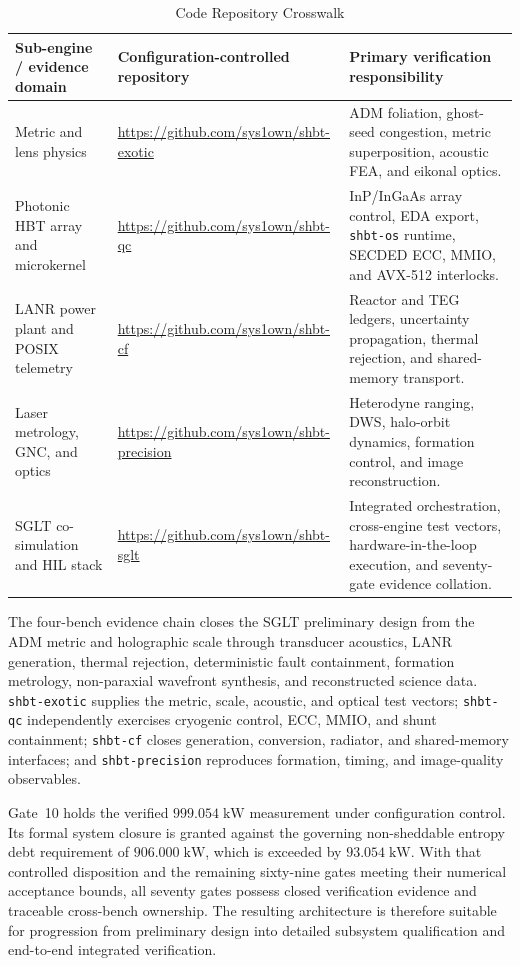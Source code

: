 \documentclass[10pt,twocolumn]{IEEEtran}
\newcommand{\shbtos}{\texttt{shbt-os}}
\begin{document}
\begin{table}[t]
\caption{Code Repository Crosswalk}
\label{tab:repository_crosswalk}
\centering
\footnotesize
\begin{tabular}{@{}p{4.1cm}p{6.3cm}p{5.4cm}@{}}
\toprule
Sub-engine / evidence domain & Configuration-controlled repository & Primary verification responsibility \\
\midrule
Metric and lens physics & \url{https://github.com/sys1own/shbt-exotic} & ADM foliation, ghost-seed congestion, metric superposition, acoustic FEA, and eikonal optics. \\
Photonic HBT array and microkernel & \url{https://github.com/sys1own/shbt-qc} & InP/InGaAs array control, EDA export, \shbtos{} runtime, SECDED ECC, MMIO, and AVX-512 interlocks. \\
LANR power plant and POSIX telemetry & \url{https://github.com/sys1own/shbt-cf} & Reactor and TEG ledgers, uncertainty propagation, thermal rejection, and shared-memory transport. \\
Laser metrology, GNC, and optics & \url{https://github.com/sys1own/shbt-precision} & Heterodyne ranging, DWS, halo-orbit dynamics, formation control, and image reconstruction. \\
SGLT co-simulation and HIL stack & \url{https://github.com/sys1own/shbt-sglt} & Integrated orchestration, cross-engine test vectors, hardware-in-the-loop execution, and seventy-gate evidence collation. \\
\bottomrule
\end{tabular}
\end{table}

The four-bench evidence chain closes the SGLT preliminary design from the ADM
metric and holographic scale through transducer acoustics, LANR generation,
thermal rejection, deterministic fault containment, formation metrology,
non-paraxial wavefront synthesis, and reconstructed science data.
\texttt{shbt-exotic} supplies the metric, scale, acoustic, and optical test
vectors; \texttt{shbt-qc} independently exercises cryogenic control, ECC,
MMIO, and shunt containment; \texttt{shbt-cf} closes generation, conversion,
radiator, and shared-memory interfaces; and \texttt{shbt-precision} reproduces
formation, timing, and image-quality observables.

Gate~10 holds the verified $999.054\;\mathrm{kW}$ measurement under
configuration control.  Its
formal system closure is granted against the governing non-sheddable entropy
debt requirement of $906.000\;\mathrm{kW}$, which is exceeded by
$93.054\;\mathrm{kW}$.  With that controlled disposition and the remaining sixty-nine gates
meeting their numerical acceptance bounds, all seventy gates possess closed
verification evidence and traceable cross-bench ownership.  The resulting
architecture is therefore suitable for progression from preliminary design
into detailed subsystem qualification and end-to-end integrated verification.
\end{document}
